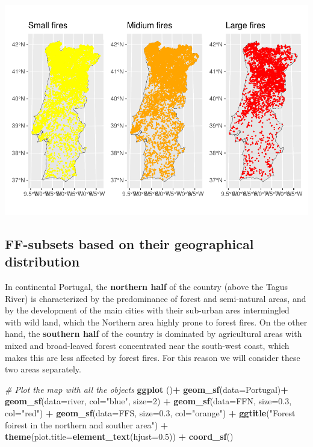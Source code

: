 \documentclass[
]{book}
\newenvironment{Shaded}{\begin{snugshade}}{\end{snugshade}}
\newcommand{\AttributeTok}[1]{\textcolor[rgb]{0.13,0.29,0.53}{#1}}
\newcommand{\CommentTok}[1]{\textcolor[rgb]{0.56,0.35,0.01}{\textit{#1}}}
\newcommand{\DecValTok}[1]{\textcolor[rgb]{0.00,0.00,0.81}{#1}}
\newcommand{\FloatTok}[1]{\textcolor[rgb]{0.00,0.00,0.81}{#1}}
\newcommand{\FunctionTok}[1]{\textcolor[rgb]{0.13,0.29,0.53}{\textbf{#1}}}
\newcommand{\NormalTok}[1]{#1}
\newcommand{\SpecialCharTok}[1]{\textcolor[rgb]{0.81,0.36,0.00}{\textbf{#1}}}
\newcommand{\StringTok}[1]{\textcolor[rgb]{0.31,0.60,0.02}{#1}}
\begin{document}
\includegraphics{03-KDE_files/figure-latex/plot-FFsubsets-1.pdf}

\hypertarget{ff-subsets-based-on-their-geographical-distribution}{%
\subsection{FF-subsets based on their geographical distribution}\label{ff-subsets-based-on-their-geographical-distribution}}

In continental Portugal, the \textbf{northern half} of the country (above the Tagus River) is characterized by the predominance of forest and semi-natural areas, and by the development of the main cities with their sub-urban ares intermingled with wild land, which the Northern area highly prone to forest fires.
On the other hand, the \textbf{southern half} of the country is dominated by agricultural areas with mixed and broad-leaved forest concentrated near the south-west coast, which makes this are less affected by forest fires.
For this reason we will consider these two areas separately.

\begin{Shaded}
\begin{Highlighting}[]
\CommentTok{\# Plot the map with all the objects}
\FunctionTok{ggplot}\NormalTok{ ()}\SpecialCharTok{+}
  \FunctionTok{geom\_sf}\NormalTok{(}\AttributeTok{data=}\NormalTok{Portugal)}\SpecialCharTok{+}
  \FunctionTok{geom\_sf}\NormalTok{(}\AttributeTok{data=}\NormalTok{river, }\AttributeTok{col=}\StringTok{"blue"}\NormalTok{, }\AttributeTok{size=}\DecValTok{2}\NormalTok{) }\SpecialCharTok{+}
  \FunctionTok{geom\_sf}\NormalTok{(}\AttributeTok{data=}\NormalTok{FFN, }\AttributeTok{size=}\FloatTok{0.3}\NormalTok{, }\AttributeTok{col=}\StringTok{"red"}\NormalTok{) }\SpecialCharTok{+}
  \FunctionTok{geom\_sf}\NormalTok{(}\AttributeTok{data=}\NormalTok{FFS, }\AttributeTok{size=}\FloatTok{0.3}\NormalTok{, }\AttributeTok{col=}\StringTok{"orange"}\NormalTok{) }\SpecialCharTok{+}
  \FunctionTok{ggtitle}\NormalTok{(}\StringTok{"Forest foirest in the northern and souther area"}\NormalTok{) }\SpecialCharTok{+}
  \FunctionTok{theme}\NormalTok{(}\AttributeTok{plot.title=}\FunctionTok{element\_text}\NormalTok{(}\AttributeTok{hjust=}\FloatTok{0.5}\NormalTok{)) }\SpecialCharTok{+}
 \FunctionTok{coord\_sf}\NormalTok{()}
\end{Highlighting}
\end{Shaded}
\end{document}
